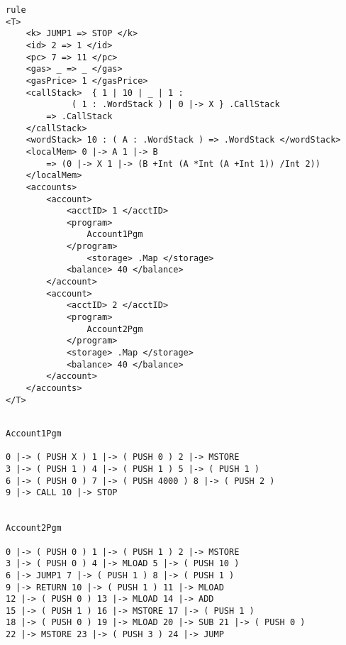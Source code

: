 \begin{verbatim}
rule
<T> 
    <k> JUMP1 => STOP </k> 
    <id> 2 => 1 </id> 
    <pc> 7 => 11 </pc> 
    <gas> _ => _ </gas>
    <gasPrice> 1 </gasPrice> 
    <callStack>  { 1 | 10 | _ | 1 : 
             ( 1 : .WordStack ) | 0 |-> X } .CallStack
        => .CallStack  
    </callStack> 
    <wordStack> 10 : ( A : .WordStack ) => .WordStack </wordStack>
    <localMem> 0 |-> A 1 |-> B 
        => (0 |-> X 1 |-> (B +Int (A *Int (A +Int 1)) /Int 2)) 
    </localMem>
    <accounts>
        <account>     
            <acctID> 1 </acctID> 
            <program>
                Account1Pgm 
            </program>
                <storage> .Map </storage>
            <balance> 40 </balance> 
        </account>
        <account>
            <acctID> 2 </acctID> 
            <program> 
                Account2Pgm
            </program>  
            <storage> .Map </storage>
            <balance> 40 </balance> 
        </account>
    </accounts>
</T>

\end{verbatim}
\begin{verbatim}

Account1Pgm

0 |-> ( PUSH X ) 1 |-> ( PUSH 0 ) 2 |-> MSTORE 
3 |-> ( PUSH 1 ) 4 |-> ( PUSH 1 ) 5 |-> ( PUSH 1 ) 
6 |-> ( PUSH 0 ) 7 |-> ( PUSH 4000 ) 8 |-> ( PUSH 2 ) 
9 |-> CALL 10 |-> STOP 

            
Account2Pgm

0 |-> ( PUSH 0 ) 1 |-> ( PUSH 1 ) 2 |-> MSTORE 
3 |-> ( PUSH 0 ) 4 |-> MLOAD 5 |-> ( PUSH 10 ) 
6 |-> JUMP1 7 |-> ( PUSH 1 ) 8 |-> ( PUSH 1 ) 
9 |-> RETURN 10 |-> ( PUSH 1 ) 11 |-> MLOAD 
12 |-> ( PUSH 0 ) 13 |-> MLOAD 14 |-> ADD 
15 |-> ( PUSH 1 ) 16 |-> MSTORE 17 |-> ( PUSH 1 ) 
18 |-> ( PUSH 0 ) 19 |-> MLOAD 20 |-> SUB 21 |-> ( PUSH 0 ) 
22 |-> MSTORE 23 |-> ( PUSH 3 ) 24 |-> JUMP
\end{verbatim}
